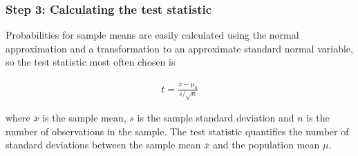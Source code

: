 \begin{spacing}{1.5}

\subsubsection{Step 3: Calculating the test statistic}

Probabilities for sample means are easily calculated using the normal approximation and a transformation to an approximate standard normal variable, so the test statistic most often chosen is 

\begin{align}
t=\frac{\overline{x}-\mu_0}{s/\sqrt{n}}
\end{align}

where $\overline{x}$ is the sample mean, $s$ is the sample standard deviation and $n$ is the number of observations in the sample. The test statistic quantifies the number of standard deviations between the sample mean $\overline{x}$ and the population mean $\mu$.


\end{spacing}
